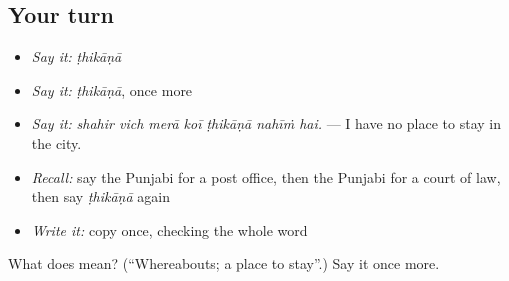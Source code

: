\subsection*{Your turn}
\begin{itemize}
\raggedright
  \item \emph{Say it:} \emph{ṭhikāṇā}
  \item \emph{Say it:} \emph{ṭhikāṇā}, once more
  \item \emph{Say it:} \emph{shahir vich merā koī ṭhikāṇā nahīṁ hai.} — I have no place to stay in the city.
  \item \emph{Recall:} say the Punjabi for a post office, then the Punjabi for a court of law, then say \emph{ṭhikāṇā} again
  \item \emph{Write it:} copy \textbf{} once, checking the whole word
\end{itemize}

\begin{tcolorbox}[breakable,colback=teal!4,colframe=teal!35!black,title={Before you move on}]
What does  mean? (\textquotedblleft{}Whereabouts; a place to stay\textquotedblright{}.) Say it once more.
\end{tcolorbox}
